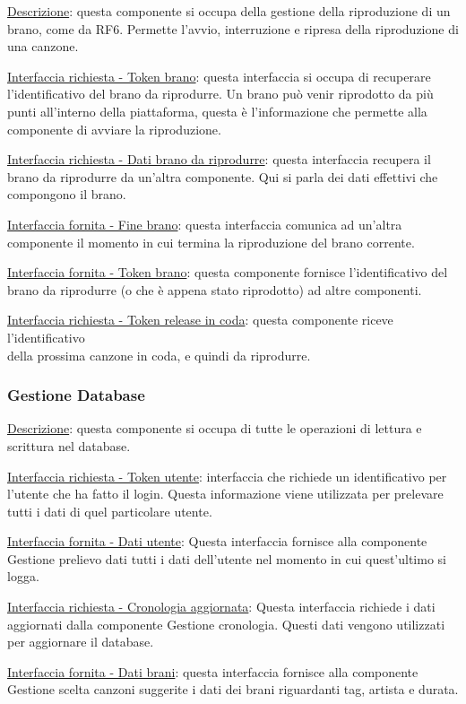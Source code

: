 \documentclass[a4paper,12pt]{article}
\begin{document}
\underline{Descrizione}: questa componente si occupa della gestione della riproduzione di un brano, come da RF6. Permette l’avvio, interruzione e ripresa della riproduzione di una canzone.

\underline{Interfaccia richiesta - Token brano}: questa interfaccia si occupa di recuperare l’identificativo del brano da riprodurre. Un brano può venir riprodotto da più punti all’interno della piattaforma, questa è l’informazione che permette alla componente di avviare la riproduzione.

\underline{Interfaccia richiesta - Dati brano da riprodurre}: questa interfaccia recupera il brano da riprodurre da un’altra componente. Qui si parla dei dati effettivi che compongono il brano.

\underline{Interfaccia fornita - Fine brano}: questa interfaccia comunica ad un’altra componente il momento in cui termina la riproduzione del brano corrente.

\underline{Interfaccia fornita - Token brano}: questa componente fornisce l’identificativo del brano da riprodurre (o che è appena stato riprodotto) ad altre componenti.

\underline{Interfaccia richiesta - Token release in coda}: questa componente riceve l'identificativo \\ della prossima canzone in coda, e quindi da riprodurre.

\subsubsection{Gestione Database}

\underline{Descrizione}: questa componente si occupa di tutte le operazioni di lettura e scrittura nel database.

\underline{Interfaccia richiesta - Token utente}: interfaccia che richiede un identificativo per l’utente che ha fatto il login. Questa informazione viene utilizzata per prelevare tutti i dati di quel particolare utente.

\underline{Interfaccia fornita - Dati utente}: Questa interfaccia fornisce alla componente Gestione prelievo dati tutti i dati dell’utente nel momento in cui quest’ultimo si logga.

\underline{Interfaccia richiesta - Cronologia aggiornata}: Questa interfaccia richiede i dati aggiornati dalla componente Gestione cronologia. Questi dati vengono utilizzati per aggiornare il database.

\underline{Interfaccia fornita - Dati brani}: questa interfaccia fornisce alla componente Gestione scelta canzoni suggerite i dati dei brani riguardanti tag, artista e durata.
\end{document}

